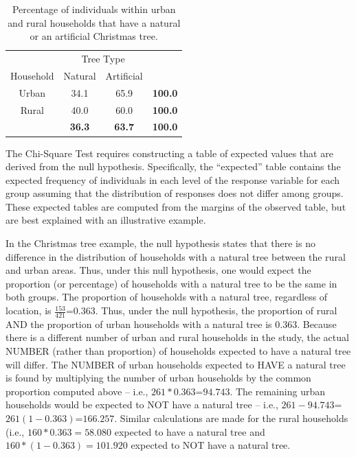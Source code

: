 \documentclass[10pt,openany]{book}\usepackage[]{graphicx}\usepackage[]{color}
\begin{document}
\begin{table}[htbp]
  \centering
  \caption{Percentage of individuals within urban and rural households that have a natural or an artificial Christmas tree.}\label{tab:ChiTreeObsProp}
    \begin{tabular}{c|c|c|c|}
      \multicolumn{1}{c}{} & \multicolumn{2}{c}{Tree Type} & \multicolumn{1}{c}{} \\
      \cline{2-3}
      Household & Natural & Artificial & \multicolumn{1}{c}{} \\
      \hline
      \multicolumn{1}{|c|}{Urban} & 34.1 & 65.9 & \textbf{100.0} \\
      \hline
      \multicolumn{1}{|c|}{Rural} & 40.0 & 60.0 & \textbf{100.0} \\
      \hline
       & \textbf{36.3} & \textbf{63.7} & \textbf{100.0} \\
      \cline{2-4}
    \end{tabular}
\end{table}

The Chi-Square Test requires constructing a table of expected values that are derived from the null hypothesis. Specifically, the ``expected'' table contains the expected frequency of individuals in each level of the response variable for each group assuming that the distribution of responses does not differ among groups. These expected tables are computed from the margins of the observed table, but are best explained with an illustrative example.

In the Christmas tree example, the null hypothesis states that there is no difference in the distribution of households with a natural tree between the rural and urban areas. Thus, under this null hypothesis, one would expect the proportion (or percentage) of households with a natural tree to be the same in both groups. The proportion of households with a natural tree, regardless of location, is $\frac{153}{421}$=$0.363$. Thus, under the null hypothesis, the proportion of rural AND the proportion of urban households with a natural tree is $0.363$. Because there is a different number of urban and rural households in the study, the actual NUMBER (rather than proportion) of households expected to have a natural tree will differ. The NUMBER of urban households expected to HAVE a natural tree is found by multiplying the number of urban households by the common proportion computed above -- i.e., $261*0.363$=$94.743$. The remaining urban households would be expected to NOT have a natural tree -- i.e., $261-94.743$=$261(1-0.363)$=$166.257$. Similar calculations are made for the rural households (i.e., $160*0.363=58.080$ expected to have a natural tree and $160*(1-0.363)=101.920$ expected to NOT have a natural tree.
\end{document}
